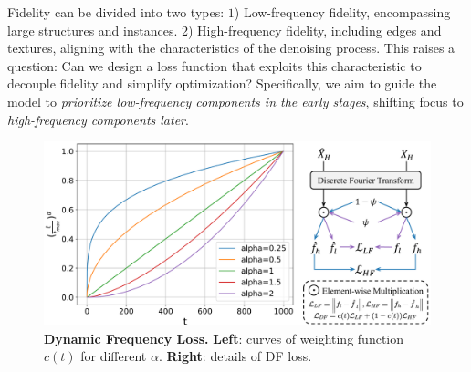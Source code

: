 Fidelity can be divided into two types: 
$1$) Low-frequency fidelity, encompassing large structures and instances. 
2) High-frequency fidelity, including edges and textures, aligning with the characteristics of the denoising process. 
This raises a question: Can we design a loss function that exploits this characteristic to decouple fidelity and simplify optimization?
Specifically, we aim to guide the model to \textit{prioritize low-frequency components in the early stages}, shifting focus to \textit{high-frequency components later}.

\begin{figure}[t!]
    \centering
    \includegraphics[width=1\linewidth]{figure/daf_method.pdf}
    \caption{\textbf{Dynamic Frequency Loss.} \textbf{Left}: curves of weighting function $c(t)$ for different $\alpha$. \textbf{Right}: details of DF loss.}
    \label{fig:daf_method}
\end{figure}

\vspace{-1em}

